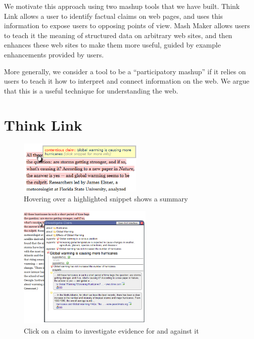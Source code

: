 \documentclass{chi2009}
\begin{document}
We motivate this approach using two mashup tools that we have built. Think Link allows a user to identify factual claims on web pages, and uses this information to expose users to opposing points of view. Mash Maker allows users to teach it the meaning of structured data on arbitrary web sites, and then enhances these web sites to make them more useful, guided by example enhancements provided by users.

More generally, we consider a tool to be a ``participatory mashup'' if it relies on users to teach it how to interpret and connect information on the web. We argue that this is a useful technique for understanding the web.

\section{Think Link}

\begin{figure}[tb]
	\begin{center}
	\includegraphics[width=6cm]{../screenshots/highlight_crop.png}
	\caption{Hovering over a highlighted snippet shows a summary}
	\label{highlight}
	\end{center}
\end{figure}

\begin{figure}[tb]
	\begin{center}
	\includegraphics[width=6.5cm]{../screenshots/claim_popup_crop2.png}
	\caption{Click on a claim to investigate evidence for and against it}
	\label{claimview}
	\end{center}
\end{figure}
\end{document}
